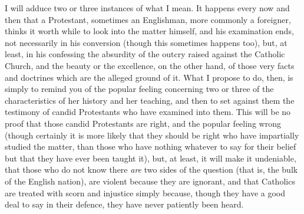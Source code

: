 I will adduce two or three instances of what I mean.
It happens every now and then that a Protestant,
sometimes an Englishman, more commonly a foreigner,
thinks it worth while to look into the matter himself,
and his examination ends, not necessarily in his
conversion (though this sometimes happens too), but, at
least, in his confessing the absurdity of the outcry
raised against the Catholic Church, and the beauty or the
excellence, on the other hand, of those very facts and
doctrines which are the alleged ground of it. What I
propose to do, then, is simply to remind you of the
popular feeling concerning two or three of the
characteristics of her history and her teaching, and then
to set against them the testimony of candid Protestants
who have examined into them. This will be no proof that
those candid Protestants are right, and the popular
feeling wrong (though certainly it is more likely that
they should be right who have impartially studied the
matter, than those who have nothing whatever to say for
their belief but that they have ever been taught it),
but, at least, it will make it undeniable, that those who
do not know there \emph{are} two sides of the question
(that is, the bulk of the English nation), are violent
because they are ignorant, and that Catholics are treated
with scorn and injustice simply because, though they have
a good deal to say in their defence, they have never
patiently been heard.

